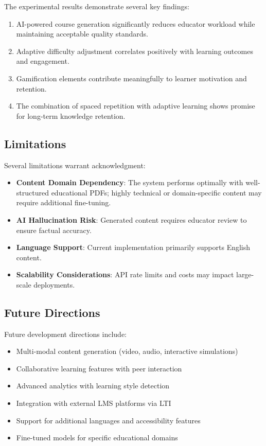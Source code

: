 \documentclass[conference]{IEEEtran}
\begin{document}
The experimental results demonstrate several key findings:

\begin{enumerate}
    \item AI-powered course generation significantly reduces educator workload while maintaining acceptable quality standards.
    \item Adaptive difficulty adjustment correlates positively with learning outcomes and engagement.
    \item Gamification elements contribute meaningfully to learner motivation and retention.
    \item The combination of spaced repetition with adaptive learning shows promise for long-term knowledge retention.
\end{enumerate}

\subsection{Limitations}

Several limitations warrant acknowledgment:

\begin{itemize}
    \item \textbf{Content Domain Dependency}: The system performs optimally with well-structured educational PDFs; highly technical or domain-specific content may require additional fine-tuning.
    \item \textbf{AI Hallucination Risk}: Generated content requires educator review to ensure factual accuracy.
    \item \textbf{Language Support}: Current implementation primarily supports English content.
    \item \textbf{Scalability Considerations}: API rate limits and costs may impact large-scale deployments.
\end{itemize}

\subsection{Future Directions}

Future development directions include:

\begin{itemize}
    \item Multi-modal content generation (video, audio, interactive simulations)
    \item Collaborative learning features with peer interaction
    \item Advanced analytics with learning style detection
    \item Integration with external LMS platforms via LTI
    \item Support for additional languages and accessibility features
    \item Fine-tuned models for specific educational domains
\end{itemize}
\end{document}
